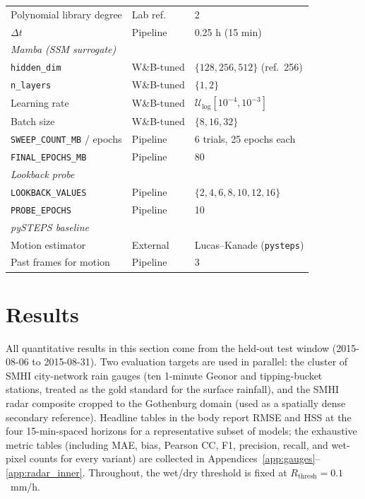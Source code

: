 \documentclass[12pt, a4paper]{article}
\begin{document}
\begin{table}[h]
\begin{tabular}{p{5.5cm}lp{6cm}}
Polynomial library degree                & Lab ref.    & 2 \\
$\Delta t$                               & Pipeline    & 0.25 h (15 min) \\
\midrule
\multicolumn{3}{l}{\textit{Mamba (SSM surrogate)}} \\
\texttt{hidden\_dim}                     & W\&B-tuned  & $\{128, 256, 512\}$ (ref.\ 256) \\
\texttt{n\_layers}                       & W\&B-tuned  & $\{1, 2\}$ \\
Learning rate                            & W\&B-tuned  & $\mathcal{U}_{\log}[10^{-4}, 10^{-3}]$ \\
Batch size                               & W\&B-tuned  & $\{8, 16, 32\}$ \\
\texttt{SWEEP\_COUNT\_MB} / epochs       & Pipeline    & 6 trials, 25 epochs each \\
\texttt{FINAL\_EPOCHS\_MB}               & Pipeline    & 80 \\
\midrule
\multicolumn{3}{l}{\textit{Lookback probe}} \\
\texttt{LOOKBACK\_VALUES}                & Pipeline    & $\{2, 4, 6, 8, 10, 12, 16\}$ \\
\texttt{PROBE\_EPOCHS}                   & Pipeline    & 10 \\
\midrule
\multicolumn{3}{l}{\textit{pySTEPS baseline}} \\
Motion estimator                         & External    & Lucas--Kanade (\texttt{pysteps}) \\
Past frames for motion                   & Pipeline    & 3 \\
\bottomrule
\end{tabular}
\end{table}

\section{Results}\label{sec:results}

All quantitative results in this section come from the held-out test
window (2015-08-06 to 2015-08-31). Two evaluation targets are used in
parallel: the cluster of SMHI city-network rain gauges (ten
1-minute Geonor and tipping-bucket stations, treated as the gold
standard for the surface rainfall), and the SMHI radar composite
cropped to the Gothenburg domain (used as a spatially dense secondary
reference). Headline tables in the body report RMSE and HSS at the
four 15-min-spaced horizons for a representative subset of models; the
exhaustive metric tables (including MAE, bias, Pearson CC, F1,
precision, recall, and wet-pixel counts for every variant) are
collected in Appendices~\ref{app:gauges}--\ref{app:radar_inner}.
Throughout, the wet/dry threshold is fixed at
$R_{\text{thresh}}=0.1$~mm/h.
\end{document}
